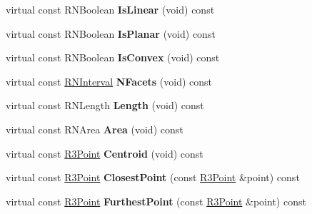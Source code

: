 \begin{DoxyCompactItemize}
\item 
virtual const R\+N\+Boolean {\bfseries Is\+Linear} (void) const \hypertarget{class_r3_triangle_array_a4089dd66ff44d9e73626aa4c81e3458b}{}\label{class_r3_triangle_array_a4089dd66ff44d9e73626aa4c81e3458b}

\item 
virtual const R\+N\+Boolean {\bfseries Is\+Planar} (void) const \hypertarget{class_r3_triangle_array_a3784e298f8d3537455dc5c85232f88c3}{}\label{class_r3_triangle_array_a3784e298f8d3537455dc5c85232f88c3}

\item 
virtual const R\+N\+Boolean {\bfseries Is\+Convex} (void) const \hypertarget{class_r3_triangle_array_ac300a6723ee5c15f39d8efd9a0a39524}{}\label{class_r3_triangle_array_ac300a6723ee5c15f39d8efd9a0a39524}

\item 
virtual const \hyperlink{class_r_n_interval}{R\+N\+Interval} {\bfseries N\+Facets} (void) const \hypertarget{class_r3_triangle_array_aa43ea1fb3a148ae5883d79106d7d1777}{}\label{class_r3_triangle_array_aa43ea1fb3a148ae5883d79106d7d1777}

\item 
virtual const R\+N\+Length {\bfseries Length} (void) const \hypertarget{class_r3_triangle_array_ac8a3721ff2860d3feb57f999eac11252}{}\label{class_r3_triangle_array_ac8a3721ff2860d3feb57f999eac11252}

\item 
virtual const R\+N\+Area {\bfseries Area} (void) const \hypertarget{class_r3_triangle_array_a3524a8d7280150e8621ba16942796ebb}{}\label{class_r3_triangle_array_a3524a8d7280150e8621ba16942796ebb}

\item 
virtual const \hyperlink{class_r3_point}{R3\+Point} {\bfseries Centroid} (void) const \hypertarget{class_r3_triangle_array_a957bc08a05b66df7faf5e1770385d4a6}{}\label{class_r3_triangle_array_a957bc08a05b66df7faf5e1770385d4a6}

\item 
virtual const \hyperlink{class_r3_point}{R3\+Point} {\bfseries Closest\+Point} (const \hyperlink{class_r3_point}{R3\+Point} \&point) const \hypertarget{class_r3_triangle_array_a6c0ad4901af2d483e9d24ececc7002a6}{}\label{class_r3_triangle_array_a6c0ad4901af2d483e9d24ececc7002a6}

\item 
virtual const \hyperlink{class_r3_point}{R3\+Point} {\bfseries Furthest\+Point} (const \hyperlink{class_r3_point}{R3\+Point} \&point) const \hypertarget{class_r3_triangle_array_ade61b803713549d86e8f8e8146c778ec}{}\label{class_r3_triangle_array_ade61b803713549d86e8f8e8146c778ec}


\end{DoxyCompactItemize}
